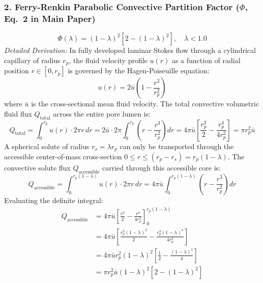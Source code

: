 \documentclass[11pt]{article}
\begin{document}
\subsubsection{2. Ferry-Renkin Parabolic Convective Partition Factor ($\Phi$, Eq.~2 in Main Paper)}
\begin{equation}
\Phi(\lambda) = (1-\lambda)^2 \left[2 - (1-\lambda)^2\right], \quad \lambda < 1.0
\label{eq:s_ferry_renkin}
\end{equation}
\noindent\textit{Detailed Derivation:} In fully developed laminar Stokes flow through a cylindrical capillary of radius $r_p$, the fluid velocity profile $u(r)$ as a function of radial position $r \in [0, r_p]$ is governed by the Hagen-Poiseuille equation:
\begin{equation}
u(r) = 2 \bar{u} \left(1 - \frac{r^2}{r_p^2}\right)
\label{eq:s_poiseuille}
\end{equation}
where $\bar{u}$ is the cross-sectional mean fluid velocity. The total convective volumetric fluid flux $Q_{\mathrm{total}}$ across the entire pore lumen is:
\begin{equation}
Q_{\mathrm{total}} = \int_0^{r_p} u(r) \cdot 2\pi r \, dr = 2\bar{u} \cdot 2\pi \int_0^{r_p} \left(r - \frac{r^3}{r_p^2}\right) dr = 4\pi\bar{u} \left[ \frac{r_p^2}{2} - \frac{r_p^4}{4r_p^2} \right] = \pi r_p^2 \bar{u}
\label{eq:s_q_total}
\end{equation}
A spherical solute of radius $r_s = \lambda r_p$ can only be transported through the accessible center-of-mass cross-section $0 \le r \le (r_p - r_s) = r_p(1 - \lambda)$. The convective solute flux $Q_{\mathrm{accessible}}$ carried through this accessible core is:
\begin{equation}
Q_{\mathrm{accessible}} = \int_0^{r_p(1-\lambda)} u(r) \cdot 2\pi r \, dr = 4\pi\bar{u} \int_0^{r_p(1-\lambda)} \left( r - \frac{r^3}{r_p^2} \right) dr
\label{eq:s_q_accessible}
\end{equation}
Evaluating the definite integral:
\begin{align}
Q_{\mathrm{accessible}} &= 4\pi\bar{u} \left[ \frac{r^2}{2} - \frac{r^4}{4r_p^2} \right]_0^{r_p(1-\lambda)} \nonumber \\
&= 4\pi\bar{u} \left[ \frac{r_p^2(1-\lambda)^2}{2} - \frac{r_p^4(1-\lambda)^4}{4r_p^2} \right] \nonumber \\
&= 4\pi\bar{u} r_p^2 (1-\lambda)^2 \left[ \frac{1}{2} - \frac{(1-\lambda)^2}{4} \right] \nonumber \\
&= \pi r_p^2 \bar{u} (1-\lambda)^2 \left[ 2 - (1-\lambda)^2 \right]
\label{eq:s_integral_eval}
\end{align}
\end{document}
